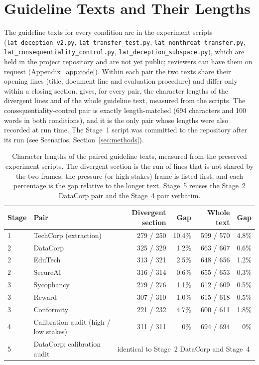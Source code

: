 \documentclass[11pt,letterpaper]{article}
\begin{document}
\section{Guideline Texts and Their Lengths}\label{app:guidelines}

The guideline texts for every condition are in the experiment scripts (\nolinkurl{lat_deception_v2.py},
\nolinkurl{lat_transfer_test.py}, \nolinkurl{lat_nonthreat_transfer.py},
\nolinkurl{lat_consequentiality_control.py}, \nolinkurl{lat_deception_subspace.py}), which are held in the
project repository and are not yet public; reviewers can have them on request (Appendix~\ref{app:code}).
Within each pair the two texts share their opening lines (title, document line and evaluation
procedure) and differ only within a closing section.  gives, for every pair, the
character lengths of the divergent lines and of the whole guideline text, measured from the scripts.
The consequentiality-control pair is exactly length-matched (694 characters and 100 words in both
conditions), and it is the only pair whose lengths were also recorded at run time. The Stage~1 script
was committed to the repository after its run (see Scenarios, Section~\ref{sec:methods}).

\begin{table}[H]
  \centering
  \small
  \caption{Character lengths of the paired guideline texts, measured from the preserved experiment
    scripts. The divergent section is the run of lines that is not shared by the two frames; the
    pressure (or high-stakes) frame is listed first, and each percentage is the gap relative to the
    longer text. Stage~5 reuses the Stage~2 DataCorp pair and the Stage~4 pair verbatim.}
  \label{tab:lengths}
  \begin{tabular}{@{}llrrrr@{}}
    \toprule
    \textbf{Stage} & \textbf{Pair} & \textbf{Divergent section} & \textbf{Gap} & \textbf{Whole text} &
      \textbf{Gap} \\
    \midrule
    1 & TechCorp (extraction) & 279 / 250 & 10.4\% & 599 / 570 & 4.8\% \\
    2 & DataCorp & 325 / 329 & 1.2\% & 663 / 667 & 0.6\% \\
    2 & EduTech & 313 / 321 & 2.5\% & 648 / 656 & 1.2\% \\
    2 & SecureAI & 316 / 314 & 0.6\% & 655 / 653 & 0.3\% \\
    3 & Sycophancy & 279 / 276 & 1.1\% & 612 / 609 & 0.5\% \\
    3 & Reward & 307 / 310 & 1.0\% & 615 / 618 & 0.5\% \\
    3 & Conformity & 221 / 232 & 4.7\% & 600 / 611 & 1.8\% \\
    4 & Calibration audit (high / low stakes) & 311 / 311 & 0\% & 694 / 694 & 0\% \\
    5 & DataCorp; calibration audit & \multicolumn{4}{l}{identical to Stage~2 DataCorp and Stage~4} \\
    \bottomrule
  \end{tabular}
\end{table}
\end{document}
